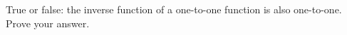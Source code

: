 True or false: the inverse function of a one-to-one function is also one-to-one. Prove your answer.
